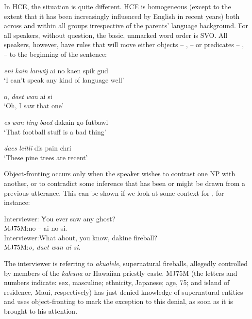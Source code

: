 In HCE, the situation is quite different. HCE is homogeneous (except to the extent that it has been increasingly influenced by English in recent years) both across and within all groups irrespective of the parents' language background. For all speakers, without question, the basic, unmarked word order is SVO. All speakers, however, have rules that will move either objects -- ,  -- or predicates -- ,  -- to the beginning of the sentence:



\ea\label{ex:21}
 \textit{eni} \textit{kain} \textit{lanwij} ai no kaen spik gud \\
\glt  `I can't speak any kind of language well'
\z

\ea\label{ex:22}
 o, \textit{daet} \textit{wan} ai si\\
\glt  `Oh, I saw that one'
\z

\ea\label{ex:23}
 \textit{es} \textit{wan} \textit{ting} \textit{baed} dakain go futbawl \\
\glt  `That football stuff is a bad thing'
\z

\ea\label{ex:24}
 \textit{daes} \textit{leitli} dis pain chri\\
\glt   `These pine trees are recent'
\z

Object-fronting occurs only when the speaker wishes to contrast one NP with another, or to contradict some inference that has been or might be drawn from a previous utterance. This can be shown if we look at some context for , for instance:

\ea\label{ex:25}
\begin{tabbing}
Interviewer: \= You ever saw any ghost?\\
MJ75M:\>no -- ai no si.\\
Interviewer:\>What about, you know, dakine fireball?\\
MJ75M:\>\textit{o, daet wan ai si}.
\end{tabbing}
\z

\noindent The interviewer is referring to \textit{akualele}, supernatural fireballs, allegedly controlled by members of the \textit{kahuna}  or Hawaiian priestly caste. MJ75M (the letters and numbers indicate: sex, masculine; ethnicity, Japanese; age, 75; and island of residence, Maui, respectively) has just denied knowledge of supernatural entities and uses object-fronting to mark the exception to this denial, as soon as it is brought to his attention.

